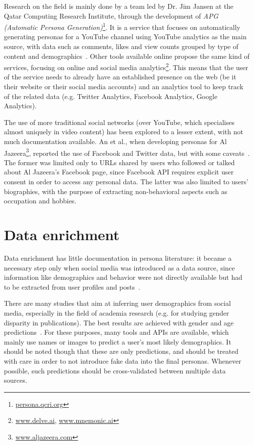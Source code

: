 Research on the field is mainly done by a team led by Dr. Jim Jansen at the Qatar Computing Research Institute, through the development of \textit{APG (Automatic Persona Generation)}\footnote{\url{persona.qcri.org}}. It is a service that focuses on automatically generating personas for a YouTube channel using YouTube analytics as the main source, with data such as comments, likes and view counts grouped by type of content and demographics~\cite{an2018imaginary}. Other tools available online propose the same kind of services, focusing on online and social media analytics\footnote{\url{www.delve.ai}, \url{www.mnemonic.ai}}. This means that the user of the service needs to already have an established presence on the web (be it their website or their social media accounts) and an analytics tool to keep track of the related data (e.g. Twitter Analytics, Facebook Analytics, Google Analytics).

The use of more traditional social networks (over YouTube, which specialises almost uniquely in video content) has been explored to a lesser extent, with not much documentation available. An et al., when developing personas for Al Jazeera\footnote{\url{www.aljazeera.com}}, reported the use of Facebook and Twitter data, but with some caveats~\cite{an2016towards}. The former was limited only to URLs shared by users who followed or talked about Al Jazeera's Facebook page, since Facebook API requires explicit user consent in order to access any personal data. The latter was also limited to users' biographies, with the purpose of extracting non-behavioral aspects such as occupation and hobbies.

\section{Data enrichment}
\label{sec:enrichment}
Data enrichment has little documentation in persona literature: it became a necessary step only when social media was introduced as a data source, since information like demographics and behavior were not directly available but had to be extracted from user profiles and posts~\cite{salminen2021survey}.

There are many studies that aim at inferring user demographics from social media, especially in the field of academia research (e.g. for studying gender disparity in publications). The best results are achieved with gender and age predictions~\cite{cesare2017well}. For these purposes, many tools and APIs are available, which mainly use names or images to predict a user's most likely demographics. It should be noted though that these are only predictions, and should be treated with care in order to not introduce fake data into the final personas. Whenever possible, such predictions should be cross-validated between multiple data sources.

